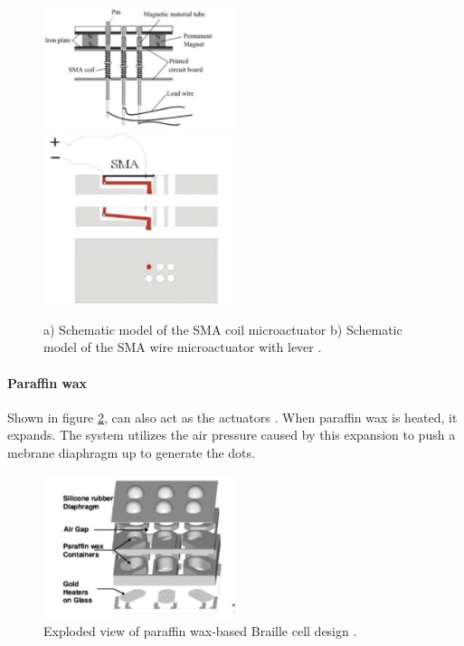 \begin{figure}[h]\centering
    \includegraphics[width=0.5\textwidth]{figures/Coil_SMA_mechanism.png}
    \includegraphics[height=5cm]{figures/sma-mechanism.png}
    \caption{ a) Schematic model of the SMA coil microactuator b) Schematic model of the SMA wire microactuator with lever \cite{haga_dynamic_2005}.}
    \label{fig:sma}
\end{figure}

\paragraph{Paraffin wax}
Shown in figure \ref{fig:paraffin}, can also act as the actuators \cite{lee_micromachined_2005}. When paraffin wax is heated, it expands.
The system utilizes the air pressure caused by this expansion to push a mebrane diaphragm up to generate the dots.

\begin{figure}[h] \centering
    \includegraphics[width=0.5\textwidth]{figures/paraffin.png}
\caption{Exploded view of paraffin wax-based Braille cell design \cite{lee_micromachined_2005}.}
\label{fig:paraffin}
\end{figure}
